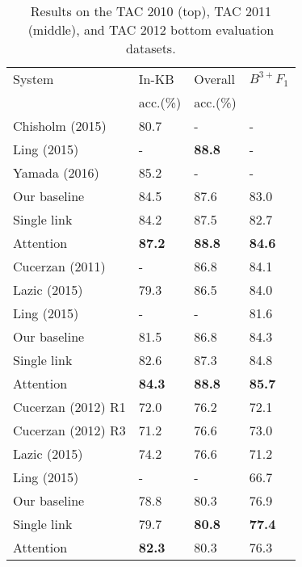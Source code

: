 \begin{table}[t!]
\centering
\begin{tabular}{l|l|l|l}
 System & In-KB & Overall & {\small ${B^{3+}F_1}$} \\ 
 & acc.(\%) & acc.(\%) & \\
\hline
\hline
Chisholm (2015) & 80.7& - & - \\
Ling (2015) & - & {\bf 88.8} & - \\
Yamada (2016)&  85.2 & - & - \\
  Our baseline & 84.5 & 87.6 & 83.0 \\
 Single link & 84.2 & 87.5 & 82.7\\
 Attention & {\bf 87.2} & {\bf 88.8} & {\bf 84.6} \\
\hline \hline
Cucerzan (2011) & - & 86.8 &  84.1 \\
Lazic (2015) & 79.3 & 86.5 & 84.0 \\
Ling (2015) &- & - & 81.6 \\
Our baseline & 81.5 & 86.8 & 84.3 \\
Single link & 82.6 & 87.3 & 84.8 \\
 Attention & {\bf 84.3} & {\bf 88.8} & {\bf 85.7} \\
\hline
\hline
Cucerzan (2012) R1 & 72.0 & 76.2 & 72.1  \\
Cucerzan (2012) R3 & 71.2 & 76.6 & 73.0 \\
Lazic (2015) & {74.2} & {76.6} & 71.2 \\
Ling (2015) & - & - & 66.7 \\
Our baseline &78.8 & 80.3 & 76.9\\
 Single link & 79.7 & {\bf 80.8} & {\bf 77.4}  \\
 Attention &{\bf 82.3} & 80.3 & 76.3 \\ \hline
\end{tabular}
\caption{Results on the TAC 2010 (top), TAC 2011 (middle), and TAC 2012 bottom evaluation datasets. \label{table:tac_results} }
\end{table}

